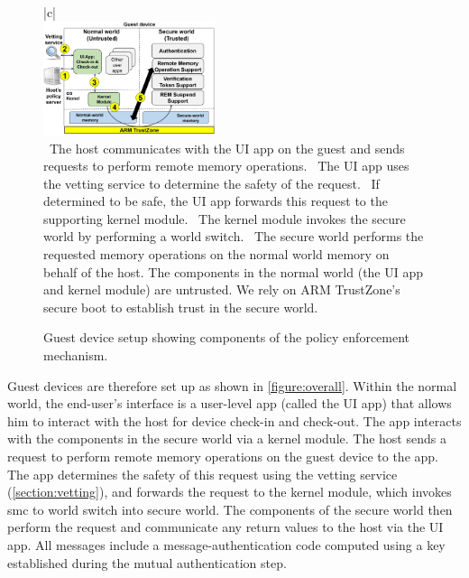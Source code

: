 \documentclass[pageno]{sig-alternate-05-2015}
\newcommand{\figref}[1]{\autoref{#1}}
\newcommand{\sectref}[1]{\autoref{#1}}
\newcommand{\mycaption}[2]{\caption{#1}#2}
\newcommand*\circled[1]{\tikz[baseline=(char.base)]{
            \node[shape=circle,draw,inner sep=0.5pt] (char) {#1};}}
\newcommand{\circone}  {\textbf{\circled{1}}}
\newcommand{\circtwo}  {\textbf{\circled{2}}}
\newcommand{\circthree}{\textbf{\circled{3}}}
\newcommand{\circfour} {\textbf{\circled{4}}}
\newcommand{\circfive} {\textbf{\circled{5}}}
\begin{document}
\begin{figure}[t!]
\begin{center}
\begin{tabular}{|c|}
\hline
\indent\vspace{-0.3cm}\\
\includegraphics[keepaspectratio=true,width=0.45\textwidth]{overall-design.png}\\
{\small \circone~The host communicates with the UI app on the guest and sends
requests to perform remote memory operations. 
%
\circtwo~The UI app uses the vetting service to determine the safety of the
request. 
%
\circthree~If determined to be safe, the UI app forwards this request to the
supporting kernel module. 
%
\circfour~The kernel module invokes the secure world by performing a world
switch. 
%
\circfive~The secure world performs the requested memory operations on the
normal world memory on behalf of the host.  The components in the normal world
(the UI app and kernel module) are untrusted. We rely on ARM TrustZone's secure
boot to establish trust in the secure world.}\\
\hline
\end{tabular}
\end{center}
\indent\vspace{-0.5cm}
\mycaption{Guest device setup showing components of the policy enforcement
mechanism.}{\label{figure:overall}}
\end{figure}

Guest devices are therefore set up as shown in \figref{figure:overall}.  Within
the normal world, the end-user's interface is a user-level app (called the UI
app) that allows him to interact with the host for device check-in and
check-out. The app interacts with the components in the secure world via a
kernel module. The host sends a request to perform remote memory operations on
the guest device to the app. The app determines the safety of this request
using the vetting service (\sectref{section:vetting}), and forwards the request
to the kernel module, which invokes \textsf{smc} to world switch into secure
world. The components of the secure world then perform the request and
communicate any return values to the host via the UI app. All messages include
a message-authentication code computed using a key established during the
mutual authentication step.
\end{document}
